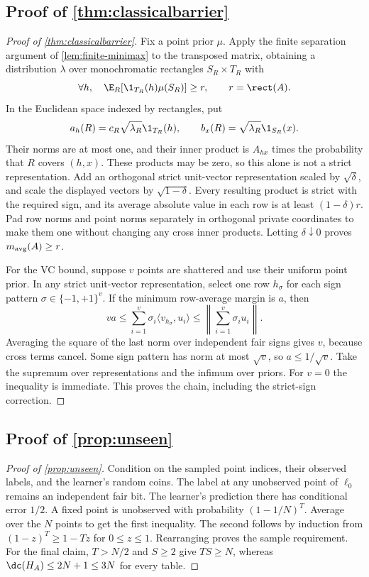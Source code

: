 \subsection[Proof of result classicalbarrier]{Proof of \cref{thm:classicalbarrier}}\label{proof:classicalbarrier}
\begin{proof}[Proof of \cref{thm:classicalbarrier}]
Fix a point prior $\mu$. Apply the finite separation argument of \cref{lem:finite-minimax} to the transposed matrix, obtaining a distribution $\lambda$ over monochromatic rectangles $S_R\times T_R$ with
\[
 \forall h,\quad\E_R[\1_{T_R}(h)\mu(S_R)]\ge r,
 \qquad r=\rect(A).
\]
In the Euclidean space indexed by rectangles, put
\[
 a_h(R)=c_R\sqrt{\lambda_R}\1_{T_R}(h),\qquad
 b_x(R)=\sqrt{\lambda_R}\1_{S_R}(x).
\]
Their norms are at most one, and their inner product is $A_{hx}$ times the probability that $R$ covers $(h,x)$. These products may be zero, so this alone is not a strict representation. Add an orthogonal strict unit-vector representation scaled by $\sqrt\delta$, and scale the displayed vectors by $\sqrt{1-\delta}$. Every resulting product is strict with the required sign, and its average absolute value in each row is at least $(1-\delta)r$. Pad row norms and point norms separately in orthogonal private coordinates to make them one without changing any cross inner products. Letting $\delta\downarrow0$ proves $m_{\rm avg}(A)\ge r$.

For the VC bound, suppose $v$ points are shattered and use their uniform point prior. In any strict unit-vector representation, select one row $h_\sigma$ for each sign pattern $\sigma\in\{-1,+1\}^v$. If the minimum row-average margin is $a$, then
\[
 va\le\sum_{i=1}^v\sigma_i\langle v_{h_\sigma},u_i\rangle
 \le\left\|\sum_{i=1}^v\sigma_i u_i\right\|.
\]
Averaging the square of the last norm over independent fair signs gives $v$, because cross terms cancel. Some sign pattern has norm at most $\sqrt v$, so $a\le1/\sqrt v$. Take the supremum over representations and the infimum over priors. For $v=0$ the inequality is immediate. This proves the chain, including the strict-sign correction.
\end{proof}
\subsection[Proof of result unseen]{Proof of \cref{prop:unseen}}\label{proof:unseen}
\begin{proof}[Proof of \cref{prop:unseen}]
Condition on the sampled point indices, their observed labels, and the learner's random coins. The label at any unobserved point of $\ell_0$ remains an independent fair bit. The learner's prediction there has conditional error $1/2$. A fixed point is unobserved with probability $(1-1/N)^T$. Average over the $N$ points to get the first inequality. The second follows by induction from $(1-z)^T\ge1-Tz$ for $0\le z\le1$. Rearranging proves the sample requirement. For the final claim, $T>N/2$ and $S\ge2$ give $TS\ge N$, whereas $\dc(H_A)\le2N+1\le3N$ for every table.
\end{proof}
